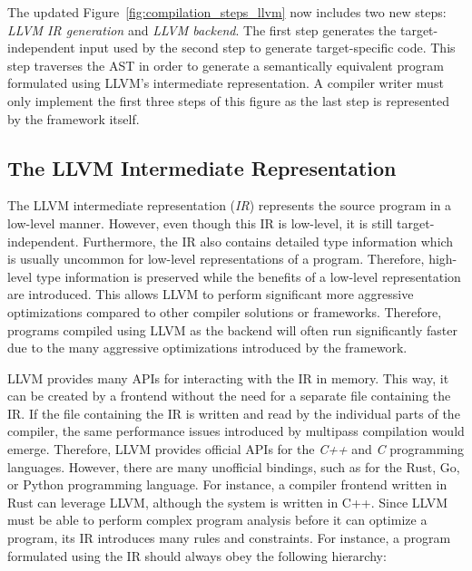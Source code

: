 
The updated Figure~\ref{fig:compilation_steps_llvm} now includes two new steps: \emph{LLVM IR generation} and \emph{LLVM backend}.
The first step generates the target-independent input used by the second step to generate target-specific code.
This step traverses the AST in order to generate a semantically equivalent program formulated using LLVM's intermediate representation.
A compiler writer must only implement the first three steps of this figure as the last step is represented by the framework itself.

\subsection{The LLVM Intermediate Representation}

The LLVM intermediate representation (\emph{IR}) represents the source program in a low-level manner.
However, even though this IR is low-level, it is still target-independent.
Furthermore, the IR also contains detailed type information which is usually uncommon for low-level representations of a program.
Therefore, high-level type information is preserved while the benefits of a low-level representation are introduced.
This allows LLVM to perform significant more aggressive optimizations compared to other compiler solutions or frameworks.
Therefore, programs compiled using LLVM as the backend will often run significantly faster due to the many aggressive optimizations introduced by the framework.

LLVM provides many APIs for interacting with the IR in memory.
This way, it can be created by a frontend without the need for a separate file containing the IR.
If the file containing the IR is written and read by the individual parts of the compiler,
the same performance issues introduced by multipass compilation would emerge.
Therefore, LLVM provides official APIs for the \emph{C++} and \emph{C} programming languages.
However, there are many unofficial bindings, such as for the Rust, Go, or Python programming language.
For instance, a compiler frontend written in Rust can leverage LLVM, although the system is written in C++.
Since LLVM must be able to perform complex program analysis before it can optimize a program,
its IR introduces many rules and constraints.
For instance, a program formulated using the IR should always obey the following hierarchy:


